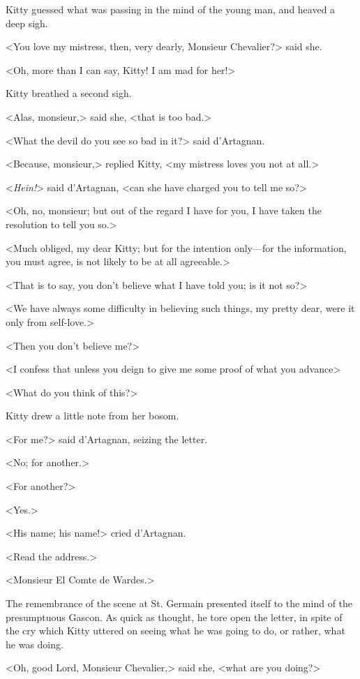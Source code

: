 Kitty guessed what was passing in the mind of the young man, and heaved a deep sigh. 

<You love my mistress, then, very dearly, Monsieur Chevalier?> said she. 

<Oh, more than I can say, Kitty! I am mad for her!> 

Kitty breathed a second sigh. 

<Alas, monsieur,> said she, <that is too bad.> 

<What the devil do you see so bad in it?> said d'Artagnan. 

<Because, monsieur,> replied Kitty, <my mistress loves you not at all.> 

<\textit{Hein!}> said d'Artagnan, <can she have charged you to tell me so?> 

<Oh, no, monsieur; but out of the regard I have for you, I have taken the resolution to tell you so.> 

<Much obliged, my dear Kitty; but for the intention only---for the information, you must agree, is not likely to be at all agreeable.> 

<That is to say, you don't believe what I have told you; is it not so?> 

<We have always some difficulty in believing such things, my pretty dear, were it only from self-love.> 

<Then you don't believe me?> 

<I confess that unless you deign to give me some proof of what you advance\longdash> 

<What do you think of this?> 

Kitty drew a little note from her bosom. 

<For me?> said d'Artagnan, seizing the letter. 

<No; for another.> 

<For another?> 

<Yes.> 

<His name; his name!> cried d'Artagnan. 

<Read the address.> 

<Monsieur El Comte de Wardes.> 

The remembrance of the scene at St. Germain presented itself to the mind of the presumptuous Gascon. As quick as thought, he tore open the letter, in spite of the cry which Kitty uttered on seeing what he was going to do, or rather, what he was doing. 

<Oh, good Lord, Monsieur Chevalier,> said she, <what are you doing?> 

